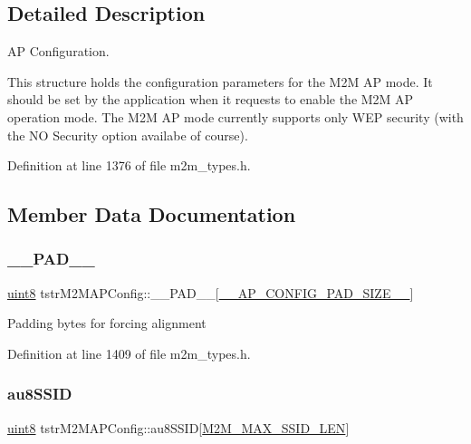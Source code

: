 \subsection{Detailed Description}
AP Configuration. 

This structure holds the configuration parameters for the M2M AP mode. It should be set by the application when it requests to enable the M2M AP operation mode. The M2M AP mode currently supports only W\+EP security (with the NO Security option availabe of course). 

Definition at line 1376 of file m2m\+\_\+types.\+h.



\subsection{Member Data Documentation}
\mbox{\label{structtstrM2MAPConfig_a2132fb69b58ed7c32910377ae0ad256d}} 
\subsubsection{\texorpdfstring{\+\_\+\+\_\+\+P\+A\+D\+\_\+\+\_\+}{\_\_PAD\_\_}}
{\footnotesize\ttfamily \hyperlink{group__DataT_ga4df709a77647e870bbf1d955b8edc9a6}{uint8} tstr\+M2\+M\+A\+P\+Config\+::\+\_\+\+\_\+\+P\+A\+D\+\_\+\+\_\+\mbox{[}\hyperlink{m2m__types_8h_ac5299b53de3b245c35f8aa74fa096044}{\+\_\+\+\_\+\+A\+P\+\_\+\+C\+O\+N\+F\+I\+G\+\_\+\+P\+A\+D\+\_\+\+S\+I\+Z\+E\+\_\+\+\_\+}\mbox{]}}

Padding bytes for forcing alignment 

Definition at line 1409 of file m2m\+\_\+types.\+h.

\mbox{\label{structtstrM2MAPConfig_a880b8f6aff1114bfb6a6f94b9351920f}} 
\subsubsection{\texorpdfstring{au8\+S\+S\+ID}{au8SSID}}
{\footnotesize\ttfamily \hyperlink{group__DataT_ga4df709a77647e870bbf1d955b8edc9a6}{uint8} tstr\+M2\+M\+A\+P\+Config\+::au8\+S\+S\+ID\mbox{[}\hyperlink{group__WlanDefines_gab2bd95c18ede2fbc07b44c5660cc0097}{M2\+M\+\_\+\+M\+A\+X\+\_\+\+S\+S\+I\+D\+\_\+\+L\+EN}\mbox{]}}

